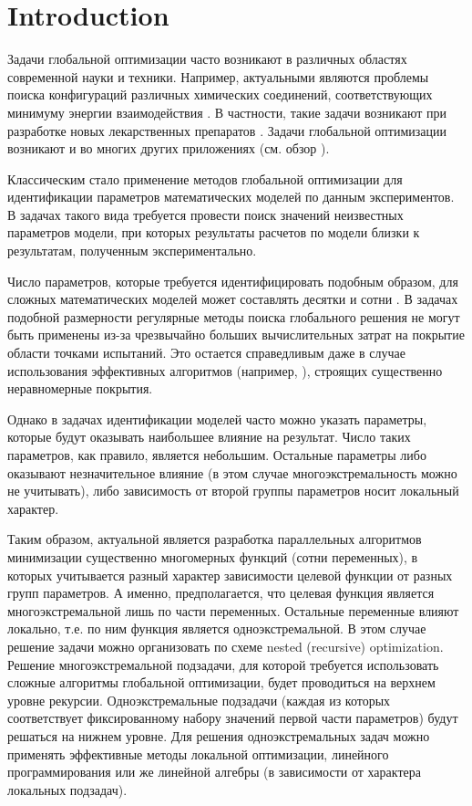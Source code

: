 \documentclass{svproc}
\begin{document}
\section{Introduction}

Задачи глобальной оптимизации часто возникают в различных областях современной науки и техники. Например,  актуальными являются проблемы поиска конфигураций различных химических соединений, соответствующих минимуму энергии взаимодействия \cite{Posypkin2014}. В частности, такие задачи возникают при разработке новых лекарственных препаратов \cite{Sulimov}. Задачи глобальной оптимизации возникают и во многих других приложениях (см. обзор  \cite{Pinter2006}). 

Классическим стало применение методов глобальной оптимизации для идентификации параметров математических моделей по данным экспериментов. В задачах такого вида требуется провести поиск значений неизвестных параметров модели, при которых результаты расчетов по модели  близки к результатам, полученным экспериментально.

Число параметров, которые требуется идентифицировать подобным образом, для сложных математических моделей может составлять десятки и сотни \cite{Nurislamova2016,Akhmadullina2017}. В задачах подобной размерности регулярные методы поиска глобального решения не могут быть применены из-за чрезвычайно больших вычислительных затрат на покрытие области точками испытаний. Это остается справедливым даже в случае использования эффективных алгоритмов (например, \cite{Paulavicius2011,Evtushenko2009,Jones2009}), строящих существенно неравномерные покрытия. 

Однако в задачах идентификации моделей часто можно указать параметры, которые будут оказывать наибольшее влияние на результат. Число таких параметров, как правило, является небольшим. Остальные параметры либо оказывают незначительное влияние (в этом случае многоэкстремальность можно не учитывать), либо зависимость от второй группы параметров носит локальный характер.

Таким образом, актуальной является разработка параллельных алгоритмов минимизации существенно многомерных функций (сотни переменных), в которых учитывается разный характер зависимости целевой функции от разных групп параметров. А именно, предполагается, что целевая функция является многоэкстремальной лишь по части переменных. Остальные переменные влияют локально, т.е. по ним функция является одноэкстремальной. 
В этом случае решение задачи можно организовать по схеме nested (recursive) optimization. Решение  многоэкстремальной подзадачи, для которой требуется использовать сложные алгоритмы глобальной оптимизации, будет проводиться на верхнем уровне рекурсии.
Одноэкстремальные подзадачи (каждая из которых соответствует фиксированному набору значений первой части параметров) будут решаться на нижнем уровне. Для решения одноэкстремальных задач можно применять эффективные методы локальной оптимизации, линейного программирования или же линейной алгебры (в зависимости от характера локальных подзадач).
\end{document}
